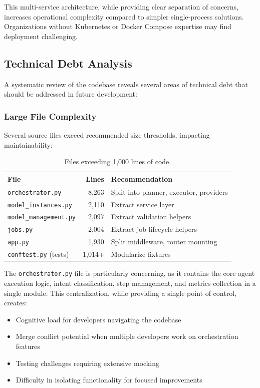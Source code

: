 This multi-service architecture, while providing clear separation of concerns, increases operational complexity compared to simpler single-process solutions. Organizations without Kubernetes or Docker Compose expertise may find deployment challenging.

\subsection{Technical Debt Analysis}
\label{subsec:technical-debt}

A systematic review of the codebase reveals several areas of technical debt that should be addressed in future development:

\subsubsection{Large File Complexity}

Several source files exceed recommended size thresholds, impacting maintainability:

\begin{table}[ht]
\centering
\caption{Files exceeding 1,000 lines of code.}
\label{tab:large-files}
\begin{tabular}{lrl}
\hline
\textbf{File} & \textbf{Lines} & \textbf{Recommendation} \\
\hline
\texttt{orchestrator.py} & 8,263 & Split into planner, executor, providers \\
\texttt{model\_instances.py} & 2,110 & Extract service layer \\
\texttt{model\_management.py} & 2,097 & Extract validation helpers \\
\texttt{jobs.py} & 2,004 & Extract job lifecycle helpers \\
\texttt{app.py} & 1,930 & Split middleware, router mounting \\
\texttt{conftest.py} (tests) & 1,014+ & Modularize fixtures \\
\hline
\end{tabular}
\end{table}

The \texttt{orchestrator.py} file is particularly concerning, as it contains the core agent execution logic, intent classification, step management, and metrics collection in a single module. This centralization, while providing a single point of control, creates:
\begin{itemize}
    \item Cognitive load for developers navigating the codebase
    \item Merge conflict potential when multiple developers work on orchestration features
    \item Testing challenges requiring extensive mocking
    \item Difficulty in isolating functionality for focused improvements
\end{itemize}

